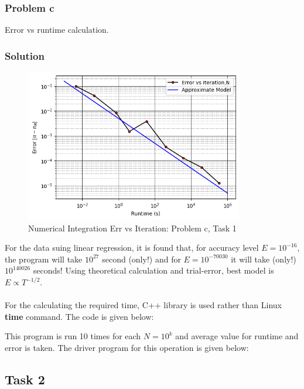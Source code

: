 \documentclass{article}
\begin{document}
\subsubsection*{Problem c } 
Error vs runtime calculation.
\subsubsection*{Solution}
\begin{figure}[h!]
  \centering
    \includegraphics[width=0.85\textwidth]{Error_vs_wall_time_curve.png}
    \caption{Numerical Integration Err vs Iteration: Problem c, Task 1} 
    \label{t1c}
\end{figure}
For the data suing linear regression, it is found that, for accuracy level $E = 10^{-16}$, the program will take $10^{27}$ second (only!) and for $E = 10^{-70030}$ it will take (only!) $10^{140026}$ seconds! Using theoretical calculation and trial-error, best model is $E \propto T^{-1/2}$.  \\
\\
For the calculating the required time, C++ library is used rather than Linux \textbf{time} command. The code is given below:

This program is run 10 times for each $N= 10^k$ and average value for runtime and error is taken.
The driver program for this operation is given below:



\subsection*{Task 2}
\end{document}
